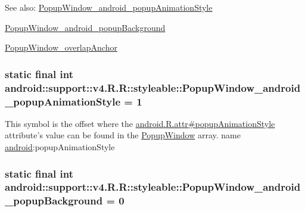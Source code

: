 \begin{Desc}
\item[See also:]\hyperlink{classandroid_1_1support_1_1v4_1_1_r_1_1styleable_f970662097b36e68ef64f2f8aac9faa6}{PopupWindow\_\-android\_\-popupAnimationStyle} 

\hyperlink{classandroid_1_1support_1_1v4_1_1_r_1_1styleable_ffd6102b5b5902031d344f853fbe672f}{PopupWindow\_\-android\_\-popupBackground} 

\hyperlink{classandroid_1_1support_1_1v4_1_1_r_1_1styleable_5bdcff06e514b36248013954ab1337cb}{PopupWindow\_\-overlapAnchor} \end{Desc}
\hypertarget{classandroid_1_1support_1_1v4_1_1_r_1_1styleable_f970662097b36e68ef64f2f8aac9faa6}{
\subsubsection[{PopupWindow\_\-android\_\-popupAnimationStyle}]{\setlength{\rightskip}{0pt plus 5cm}static final int android::support::v4.R.R::styleable::PopupWindow\_\-android\_\-popupAnimationStyle = 1}}
\label{classandroid_1_1support_1_1v4_1_1_r_1_1styleable_f970662097b36e68ef64f2f8aac9faa6}


This symbol is the offset where the \hyperlink{}{android.R.attr\#popupAnimationStyle} attribute's value can be found in the \hyperlink{classandroid_1_1support_1_1v4_1_1_r_1_1styleable_f2e6c1d44ab2f0d74ae025658a5ce5c3}{PopupWindow} array.  name \hyperlink{namespaceandroid}{android}:popupAnimationStyle \hypertarget{classandroid_1_1support_1_1v4_1_1_r_1_1styleable_ffd6102b5b5902031d344f853fbe672f}{
\subsubsection[{PopupWindow\_\-android\_\-popupBackground}]{\setlength{\rightskip}{0pt plus 5cm}static final int android::support::v4.R.R::styleable::PopupWindow\_\-android\_\-popupBackground = 0}}
\label{classandroid_1_1support_1_1v4_1_1_r_1_1styleable_ffd6102b5b5902031d344f853fbe672f}



